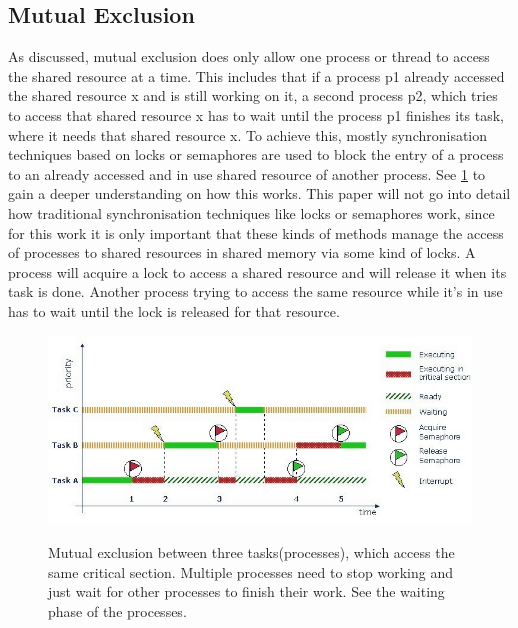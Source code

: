 \subsection{Mutual Exclusion}\label{subsec:mutual-exclusion}

As discussed, mutual exclusion does only allow one process or thread to access the shared resource at a time. This includes that if a process p1 already accessed the shared resource x and is still working on it, a second process p2, which tries to access that shared resource x has to wait until the process p1 finishes its task, where it needs that shared resource x. To achieve this, mostly synchronisation techniques based on locks or semaphores are used to block the entry of a process to an already accessed and in use shared resource of another process. See \cref{fig:mutual-exclusion} to gain a deeper understanding on how this works. This paper will not go into detail how traditional synchronisation techniques like locks or semaphores work, since for this work it is only important that these kinds of methods manage the access of processes to shared resources in shared memory via some kind of locks. A process will acquire a lock to access a shared resource and will release it when its task is done. Another process trying to access the same resource while it's in use has to wait until the lock is released for that resource.

\begin{figure}[!ht]
    \centering
    \captionsetup{justification=centering}
    \caption{Mutual exclusion between three tasks(processes), which access the same critical section. Multiple processes need to stop working and just wait for other processes to finish their work. See the waiting phase of the processes.}
    \includegraphics[width=135mm]{images/mutual_exclusion.jpg}
    \cite{MutualExclusion}
    \label{fig:mutual-exclusion}
\end{figure}

